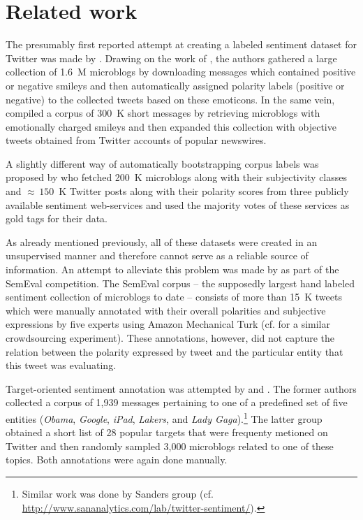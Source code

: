 \section{Related work}

The presumably first reported attempt at creating a labeled sentiment
dataset for Twitter was made by \citet{Go:09}.  Drawing on the work of
\citet{Read:05}, the authors gathered a large collection of 1.6~M
microblogs by downloading messages which contained positive or
negative smileys and then automatically assigned polarity labels
(positive or negative) to the collected tweets based on these
emoticons.  In the same vein, \citet{Pak:10} compiled a corpus of
300~K short messages by retrieving microblogs with emotionally charged
smileys and then expanded this collection with objective tweets
obtained from Twitter accounts of popular newswires.

A slightly different way of automatically bootstrapping corpus labels
was proposed by \citet{Barbosa:10} who fetched 200~K microblogs along
with their subjectivity classes and ${\approx}\,150$~K Twitter posts
along with their polarity scores from three publicly available
sentiment web-services and used the majority votes of these services
as gold tags for their data.

As already mentioned previously, all of these datasets were created in
an unsupervised manner and therefore cannot serve as a reliable source
of information.  An attempt to alleviate this problem was made by
\citet{Nakov:13} as part of the SemEval competition.  The SemEval
corpus -- the supposedly largest hand labeled sentiment collection of
microblogs to date -- consists of more than 15~K tweets which were
manually annotated with their overall polarities and subjective
expressions by five experts using Amazon Mechanical Turk
(cf. \citet{diakopoulos:10} for a similar crowdsourcing
experiment). These annotations, however, did not capture the relation
between the polarity expressed by tweet and the particular entity that
this tweet was evaluating.

Target-oriented sentiment annotation was attempted by \citet{Jiang:11}
and \citet{Saif:13}.  The former authors collected a corpus of 1,939
messages pertaining to one of a predefined set of five entities
(\emph{Obama}, \emph{Google}, \emph{iPad}, \emph{Lakers}, and
\emph{Lady Gaga}).\footnote{Similar work was done by Sanders group
  (cf. \url{http://www.sananalytics.com/lab/twitter-sentiment/}).} The
latter group obtained a short list of 28 popular targets that were
frequenty metioned on Twitter and then randomly sampled 3,000
microblogs related to one of these topics.  Both annotations were
again done manually.

